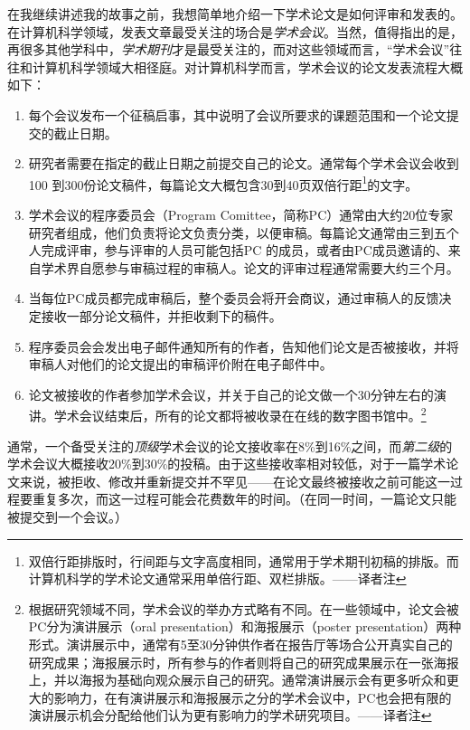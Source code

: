\documentclass[letter,12pt]{book}
\begin{document}
\begin{CJK}{UTF8}{gbsn}
\breakline

在我继续讲述我的故事之前，我想简单地介绍一下学术论文是如何评审和发表的。在计算机科学领域，发表文章最受关注的场合是\emph{学术会议}。当然，值得指出的是，再很多其他学科中，\emph{学术期刊}才是最受关注的，而对这些领域而言，“学术会议”往往和计算机科学领域大相径庭。对计算机科学而言，学术会议的论文发表流程大概如下：

\begin{enumerate}
\item 每个会议发布一个征稿启事，其中说明了会议所要求的课题范围和一个论文提交的截止日期。
\item 研究者需要在指定的截止日期之前提交自己的论文。通常每个学术会议会收到100 到300份论文稿件，每篇论文大概包含30到40页双倍行距\footnote{双倍行距排版时，行间距与文字高度相同，通常用于学术期刊初稿的排版。而计算机科学的学术论文通常采用单倍行距、双栏排版。——译者注}的文字。
\item 学术会议的程序委员会（Program Comittee，简称PC）通常由大约20位专家研究者组成，他们负责将论文负责分类，以便审稿。每篇论文通常由三到五个人完成评审，参与评审的人员可能包括PC 的成员，或者由PC成员邀请的、来自学术界自愿参与审稿过程的审稿人。论文的评审过程通常需要大约三个月。
\item 当每位PC成员都完成审稿后，整个委员会将开会商议，通过审稿人的反馈决定接收一部分论文稿件，并拒收剩下的稿件。
\item 程序委员会会发出电子邮件通知所有的作者，告知他们论文是否被接收，并将审稿人对他们的论文提出的审稿评价附在电子邮件中。
\item 论文被接收的作者参加学术会议，并关于自己的论文做一个30分钟左右的演讲。学术会议结束后，所有的论文都将被收录在在线的数字图书馆中。\footnote{根据研究领域不同，学术会议的举办方式略有不同。在一些领域中，论文会被PC分为演讲展示（oral presentation）和海报展示（poster presentation）两种形式。演讲展示中，通常有5至30分钟供作者在报告厅等场合公开真实自己的研究成果；海报展示时，所有参与的作者则将自己的研究成果展示在一张海报上，并以海报为基础向观众展示自己的研究。通常演讲展示会有更多听众和更大的影响力，在有演讲展示和海报展示之分的学术会议中，PC也会把有限的演讲展示机会分配给他们认为更有影响力的学术研究项目。——译者注}
\end{enumerate}

通常，一个备受关注的\emph{顶级}学术会议的论文接收率在8\%到16\%之间，而\emph{第二级}的学术会议大概接收20\%到30\%的投稿。由于这些接收率相对较低，对于一篇学术论文来说，被拒收、修改并重新提交并不罕见——在论文最终被接收之前可能这一过程要重复多次，而这一过程可能会花费数年的时间。（在同一时间，一篇论文只能被提交到一个会议。）


\end{CJK}
\end{document}
